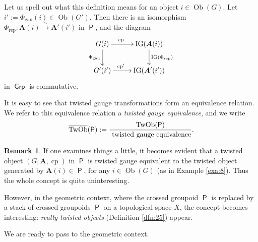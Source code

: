 \documentclass[a4paper, 10pt]{amsart}
\theoremstyle{definition}
\newtheorem{rem}[equation]{Remark}
\numberwithin{equation}{section}
\newcommand{\iso}{\xrightarrow{\simeq}}
\newcommand{\opn}{\operatorname}
\newcommand{\cat}[1]{\operatorname{\mathsf{#1}}}
\newcommand{\ol}{\overline}
\newcommand{\mrm}[1]{\mathrm{#1}}
\newcommand{\tup}[1]{\textup{#1}}
\newcommand{\bsym}[1]{\boldsymbol{#1}}
\newcommand{\twocat}[1]{\operatorname{\bsym{\cat{#1}}}}
\begin{document}
Let us spell out what this definition means for an object
$i \in \opn{Ob} (G)$.
Let $i' := \Phi_{\mrm{gau}}(i) \in \opn{Ob} (G')$.
Then there is an isomorphism
$\Phi_{\mrm{rep}} : \bsym{A}(i) \iso \bsym{A}'(i')$
in $\cat{P}$, and the diagram
\[ \UseTips \xymatrix @C=6ex @R=5ex {
G(i)
\ar[r]^(0.4){\opn{cp}}
\ar[d]_{\Phi_{\mrm{gau}}}
& 
\opn{IG}(\bsym{A}(i))
\ar[d]^{\opn{IG}(\Phi_{\mrm{rep}})}
\\
G'(i')
\ar[r]^(0.4){\opn{cp}'}
& 
\opn{IG}(\bsym{A}'(i'))
} \]
in $\cat{Grp}$ is commutative. 

It is easy to see that twisted gauge transformations form an equivalence
relation. We refer to this equivalence relation a {\em twisted gauge
equivalence}, and we write
\[ \ol{\opn{TwOb}}(\cat{P}) :=
\frac{ \opn{TwOb}(\cat{P}) }
{\tup{ twisted gauge equivalence}}  . \]

\begin{rem}
If one examines things a little, it becomes evident that a
twisted object $(G, \bsym{A}, \opn{cp})$
in $\cat{P}$ is twisted gauge equivalent to the twisted object
generated by $\bsym{A}(i) \in \cat{P}$, for any $i \in \opn{Ob} (G)$ (as
in Example \ref{exa:8}). Thus the whole concept is quite uninteresting. 

However, in the geometric context, where the crossed groupoid $\cat{P}$ is
replaced by a stack of crossed groupoids $\twocat{P}$ on a topological space
$X$, the concept becomes interesting: {\em really twisted objects}
(Definition \ref{dfn:25}) appear.
\end{rem}

We are ready to pass to the geometric context.
\end{document}
